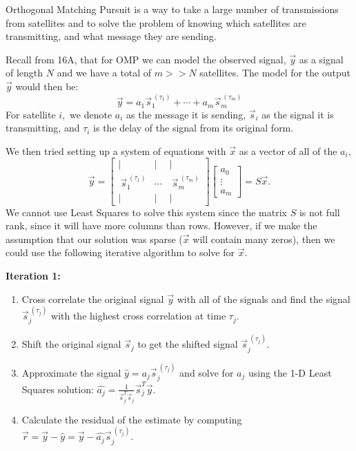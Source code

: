 

Orthogonal Matching Pursuit is a way to take a large number of transmissions from satellites and to solve the problem of knowing which satellites are transmitting, and what message they are sending.

Recall from 16A, that for OMP we can model the observed signal, $\vec{y}$ as a signal of length $N$ and we have a total of $m >> N$ satellites. The model for the output $\vec{y}$ would then be:
\begin{equation}
\vec{y} = a_{1} \vec{s}_{1}^{\ (\tau_{1})} + \cdots + a_m \vec{s}_{m}^{\ (\tau_{m})}
\end{equation}
For satellite $i,$ we denote $a_{i}$ as the message it is sending, $\vec{s}_{i}$ as the signal it is transmitting, and $\tau_{i}$ is the delay of the signal from its original form. 

We then tried setting up a system of equations with $\vec{x}$ as a vector of all of the $a_i,$
\begin{equation}
\vec{y} = 
\begin{bmatrix} 
| & | & | \\
\ \vec{s}_{1}^{\ (\tau_{1})} & \cdots & \ \vec{s}_{m}^{\ (\tau_{m})} \\
| & | & | 
\end{bmatrix}
\begin{bmatrix} a_{0} \\ \vdots \\ a_{m} \end{bmatrix} = S \vec{x}. 
\end{equation}
We cannot use Least Squares to solve this system since the matrix $S$ is not full rank, since it will have more columns than rows.
However, if we make the assumption that our solution was sparse ($\vec{x}$ will contain many zeros), then we could use the following iterative algorithm to solve for $\vec{x}.$

\textbf{Iteration 1:}
\begin{enumerate}[label=(\arabic*)]
  \item Cross correlate the original signal $\vec{y}$ with all of the signals and find the signal $\vec{s}_{j}^{\ ({\tau_{j}})}$ with the highest cross correlation at time $\tau_{j}.$
  \item Shift the original signal $\vec{s}_{j}$ to get the shifted signal $\vec{s}_{j}^{\ (\tau_{j})}.$
  \item Approximate the signal $\hat{y} = a_{j} \vec{s}_{j}^{\ (\tau_{j})}$ and solve for $a_{j}$ using the 1-D Least Squares solution: $\hat{a_{j}} = \frac{1}{\vec{s}_{j}^{T} \vec{s}_{j}} \vec{s}_{j}^{T} \vec{y}.$
  \item Calculate the residual of the estimate by computing $\vec{r} = \vec{y} - \hat{y} = \vec{y} - \hat{a_{j}} \vec{s}_{j}^{\ (\tau_{j})}.$
\end{enumerate}

